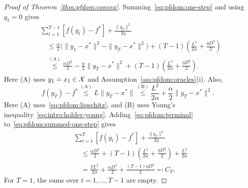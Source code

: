 \begin{proof}[Proof of Theorem~\ref{thm:pfdom:convex}]
Summing~\eqref{eq:pfdom:one-step} and using $q_1=0$ gives
\begin{equation}\label{eq:pfdom:summed-one-step}
\begin{aligned}
 &\sum_{t=1}^{T-1}[f(y_t)-f^*]+\frac{\|q_T\|^2}{2\eta}\\
 &\quad\le\frac\alpha2\bigl(\|y_1-x^*\|^2-\|y_T-x^*\|^2\bigr)
   +(T-1)\left(\frac{L^2}{2\alpha}+\frac{\eta D^2}{2}\right)\\
 &\quad\overset{\mathrm{(A)}}{\le}\frac{\alpha D^2}{2}
   -\frac\alpha2\|y_T-x^*\|^2
   +(T-1)\left(\frac{L^2}{2\alpha}+\frac{\eta D^2}{2}\right).
\end{aligned}
\end{equation}
Here (A) uses $y_1=x_1\in\mathcal{X}$ and
Assumption~\ref{ass:pfdom:oracles}(i). Also,
\begin{equation}\label{eq:pfdom:terminal}
 f(y_T)-f^*\overset{\mathrm{(A)}}{\le}L\|y_T-x^*\|
 \overset{\mathrm{(B)}}{\le}\frac{L^2}{2\alpha}
   +\frac\alpha2\|y_T-x^*\|^2.
\end{equation}
Here (A) uses~\eqref{eq:pfdom:lipschitz}, and (B) uses
Young's inequality~\eqref{eq:intro:holder-young}.
Adding~\eqref{eq:pfdom:terminal} to~\eqref{eq:pfdom:summed-one-step} gives
\begin{equation}\label{eq:pfdom:potential-bound}
\begin{aligned}
 &\sum_{t=1}^T[f(y_t)-f^*]+\frac{\|q_T\|^2}{2\eta}\\
 &\quad\le\frac{\alpha D^2}{2}
   +(T-1)\left(\frac{L^2}{2\alpha}+\frac{\eta D^2}{2}\right)
   +\frac{L^2}{2\alpha}\\
 &\quad=\frac{TL^2}{2\alpha}+\frac{\alpha D^2}{2}
   +\frac{(T-1)\eta D^2}{2}\eqqcolon C_T.
\end{aligned}
\end{equation}
For $T=1$, the sums over $t=1,\ldots,T-1$ are empty.


\end{proof}
